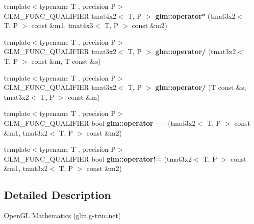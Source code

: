\begin{DoxyCompactItemize}
\item 
\hypertarget{namespaceglm_aa2507681a80e35a140d713d4f82a015f}{{\footnotesize template$<$typename T , precision P$>$ }\\G\-L\-M\-\_\-\-F\-U\-N\-C\-\_\-\-Q\-U\-A\-L\-I\-F\-I\-E\-R tmat4x2$<$ T, P $>$ {\bfseries glm\-::operator$\ast$} (tmat3x2$<$ T, P $>$ const \&m1, tmat4x3$<$ T, P $>$ const \&m2)}\label{namespaceglm_aa2507681a80e35a140d713d4f82a015f}

\item 
\hypertarget{namespaceglm_ae2526344e7b366a2cabb1b48daba961e}{{\footnotesize template$<$typename T , precision P$>$ }\\G\-L\-M\-\_\-\-F\-U\-N\-C\-\_\-\-Q\-U\-A\-L\-I\-F\-I\-E\-R tmat3x2$<$ T, P $>$ {\bfseries glm\-::operator/} (tmat3x2$<$ T, P $>$ const \&m, T const \&s)}\label{namespaceglm_ae2526344e7b366a2cabb1b48daba961e}

\item 
\hypertarget{namespaceglm_a47965b2cdab0ed5c725e0d469c5e6865}{{\footnotesize template$<$typename T , precision P$>$ }\\G\-L\-M\-\_\-\-F\-U\-N\-C\-\_\-\-Q\-U\-A\-L\-I\-F\-I\-E\-R tmat3x2$<$ T, P $>$ {\bfseries glm\-::operator/} (T const \&s, tmat3x2$<$ T, P $>$ const \&m)}\label{namespaceglm_a47965b2cdab0ed5c725e0d469c5e6865}

\item 
\hypertarget{namespaceglm_af31e44ac30f1ebf93cc4324d0cde3050}{{\footnotesize template$<$typename T , precision P$>$ }\\G\-L\-M\-\_\-\-F\-U\-N\-C\-\_\-\-Q\-U\-A\-L\-I\-F\-I\-E\-R bool {\bfseries glm\-::operator==} (tmat3x2$<$ T, P $>$ const \&m1, tmat3x2$<$ T, P $>$ const \&m2)}\label{namespaceglm_af31e44ac30f1ebf93cc4324d0cde3050}

\item 
\hypertarget{namespaceglm_ab6d7d37966e4c81709adf07b0fd9a9d0}{{\footnotesize template$<$typename T , precision P$>$ }\\G\-L\-M\-\_\-\-F\-U\-N\-C\-\_\-\-Q\-U\-A\-L\-I\-F\-I\-E\-R bool {\bfseries glm\-::operator!=} (tmat3x2$<$ T, P $>$ const \&m1, tmat3x2$<$ T, P $>$ const \&m2)}\label{namespaceglm_ab6d7d37966e4c81709adf07b0fd9a9d0}

\end{DoxyCompactItemize}


\subsection{Detailed Description}
Open\-G\-L Mathematics (glm.\-g-\/truc.\-net)

